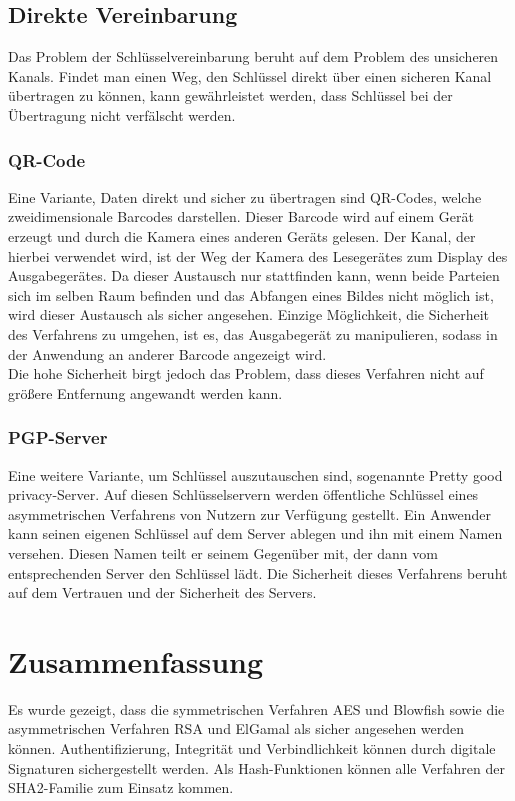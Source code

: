 \documentclass[10pt, a4paper,headsepline,pointednumbers]{scrreprt}
\begin{document}
\subsection{Direkte Vereinbarung}
Das Problem der Schlüsselvereinbarung beruht auf dem Problem des unsicheren Kanals. Findet man einen Weg, den Schlüssel direkt über einen sicheren Kanal übertragen zu können, kann gewährleistet werden, dass Schlüssel bei der Übertragung nicht verfälscht werden.
\subsubsection{QR-Code}
Eine Variante, Daten direkt und sicher zu übertragen sind QR-Codes, welche zweidimensionale Barcodes darstellen. Dieser Barcode wird auf einem Gerät erzeugt und durch die Kamera eines anderen Geräts gelesen. Der Kanal, der hierbei verwendet wird, ist der Weg der Kamera des Lesegerätes zum Display des Ausgabegerätes. Da dieser Austausch nur stattfinden kann, wenn beide Parteien sich im selben Raum befinden und das Abfangen eines Bildes nicht möglich ist, wird dieser Austausch als sicher angesehen. Einzige Möglichkeit, die Sicherheit des Verfahrens zu umgehen, ist es, das Ausgabegerät zu manipulieren, sodass in der Anwendung an anderer Barcode angezeigt wird. \\
Die hohe Sicherheit birgt jedoch das Problem, dass dieses Verfahren nicht auf größere Entfernung angewandt werden kann.

\subsubsection{PGP-Server}
Eine weitere Variante, um Schlüssel auszutauschen sind, sogenannte Pretty good privacy-Server. Auf diesen Schlüsselservern werden öffentliche Schlüssel eines asymmetrischen Verfahrens von Nutzern zur Verfügung gestellt. Ein Anwender kann seinen eigenen Schlüssel auf dem Server ablegen und ihn mit einem Namen versehen. Diesen Namen teilt er seinem Gegenüber mit, der dann vom entsprechenden Server den Schlüssel lädt. Die Sicherheit dieses Verfahrens beruht auf dem Vertrauen und der Sicherheit des Servers.


\section {Zusammenfassung}
Es wurde gezeigt, dass die symmetrischen Verfahren AES und Blowfish sowie die asymmetrischen Verfahren RSA und ElGamal als sicher angesehen werden können. Authentifizierung, Integrität und Verbindlichkeit können durch digitale Signaturen sichergestellt werden. Als Hash-Funktionen können alle Verfahren der SHA2-Familie zum Einsatz kommen.
\end{document}
